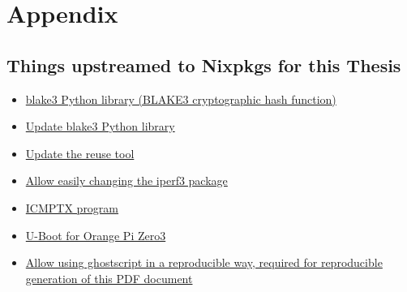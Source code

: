 
\chapter{Appendix}
\label{chap:appendix}

\section{Things upstreamed to Nixpkgs for this Thesis}
\begin{itemize}
  \item \href{https://github.com/NixOS/nixpkgs/pull/343277}{blake3 Python library (BLAKE3 cryptographic hash function)}
  \item \href{https://github.com/NixOS/nixpkgs/pull/360435}{Update blake3 Python library}
  \item \href{https://github.com/NixOS/nixpkgs/pull/281636}{Update the reuse tool}
  \item \href{https://github.com/NixOS/nixpkgs/pull/333462}{Allow easily changing the iperf3 package}
  \item \href{https://github.com/NixOS/nixpkgs/pull/357574}{ICMPTX program}
  \item \href{https://github.com/NixOS/nixpkgs/pull/326845}{U-Boot for Orange Pi Zero3}
  \item \href{https://github.com/NixOS/nixpkgs/pull/362173}{Allow using ghostscript in a reproducible way, required for reproducible generation of this PDF document}
\end{itemize}
